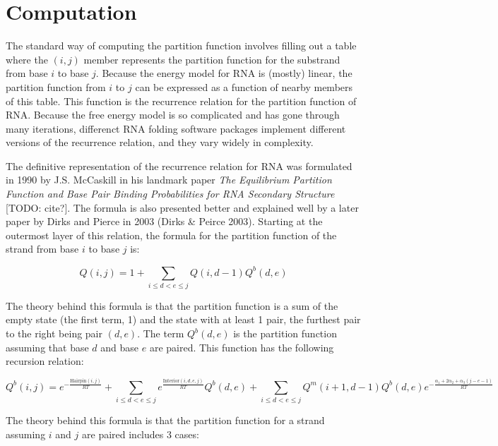 \section{Computation}

The standard way of computing the partition function involves filling
out a table where the $(i,j)$ member represents the partition function
for the substrand from base $i$ to base $j$. Because the energy model
for RNA is (mostly) linear, the partition function from $i$ to $j$ can
be expressed as a function of nearby members of this table. This
function is the recurrence relation for the partition function of
RNA. Because the free energy model is so complicated and has gone
through many iterations, differenct RNA folding software packages
implement different versions of the recurrence relation, and they vary
widely in complexity.

The definitive representation of the recurrence relation for RNA was
formulated in 1990 by J.S. McCaskill in his landmark paper \emph{The
Equilibrium Partition Function and Base Pair Binding Probabilities for
RNA Secondary Structure} [TODO: cite?]. The formula is also presented
better and explained well by a later paper by Dirks and Pierce in 2003
(Dirks \& Peirce 2003). Starting at the outermost layer of this
relation, the formula for the partition function of the strand from
base $i$ to base $j$ is:

\begin{equation} Q(i,j) = 1 + \sum_{i \leq d < e \leq j}Q(i, d - 1)
Q^b(d, e) \end{equation}

The theory behind this formula is that the partition function is a sum
of the empty state (the first term, 1) and the state with at least 1
pair, the furthest pair to the right being pair $(d,e)$. The term
$Q^b(d,e)$ is the partition function assuming that base $d$ and base
$e$ are paired. This function has the following recursion relation:

\begin{equation} Q^b(i, j) = e^{-\frac{\text{Hairpin}(i,j)}{RT}} +
\sum_{i \leq d < e \leq j} e^{\frac{\text{Interior}(i, d, e,
j)}{RT}}Q^b(d,e) + \sum_{i \leq d < e \leq j} Q^m(i + 1, d - 1)Q^b(d,
e) e^{-\frac{\alpha_1 + 2\alpha_2 + \alpha_3(j-e-1)}{RT}}
\end{equation}

The theory behind this formula is that the partition function for a
strand assuming $i$ and $j$ are paired includes 3 cases:


